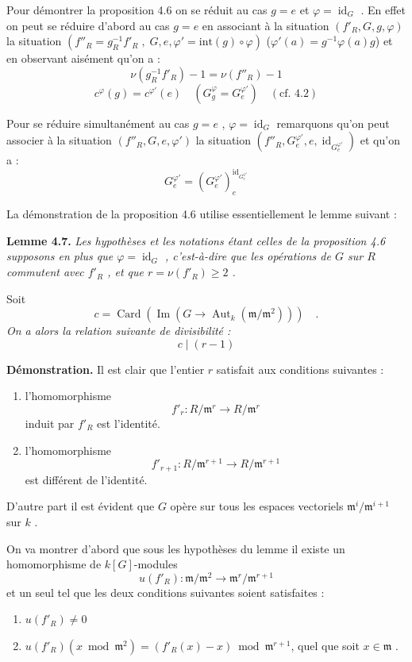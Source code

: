 \documentclass[11pt]{article}
\providecommand{\fm}{\mathfrak{m}}
\providecommand{\id}{\operatorname{id}}
\providecommand{\id}{\operatorname{id}}
\providecommand{\id}{\operatorname{id}}
\providecommand{\Aut}{\operatorname{Aut}}
\providecommand{\id}{\operatorname{id}}
\providecommand{\id}{\operatorname{id}}
\providecommand{\im}{\operatorname{Im}}
\providecommand{\fm}{\mathfrak m}
\providecommand{\im}{\operatorname{im}}
\providecommand{\Aut}{\operatorname{Aut}}
\providecommand{\id}{\operatorname{id}}
\begin{document}
\medskip

Pour démontrer la proposition 4.6 on se réduit au cas $g = e$ et $\varphi = \id_G$ . En effet on peut se réduire d'abord au cas $g = e$ en associant à la situation $(f'_R, G, g, \varphi)$ la situation $(f''_R = g_R^{-1}f'_R \; , \; G, e, \varphi' = \mathrm{int}(g) \circ \varphi)$ ($\varphi'(a) = g^{-1}\varphi(a)g$) et en observant aisément qu'on a :
\[
\nu(g_R^{-1}f'_R) - 1 = \nu(f''_R) - 1
\]
\[
c^\varphi(g) = c^{\varphi'}(e) \quad (G_g^\varphi = G_e^{\varphi'}) \quad (\text{cf. 4.2})
\]

Pour se réduire simultanément au cas $g = e$ , $\varphi = \id_G$ remarquons qu'on peut associer à la situation $(f''_R, G, e, \varphi')$ la situation $(f''_R, G_e^{\varphi'}, e, \id_{G_e^{\varphi'}})$ et qu'on a :
\[
G_e^{\varphi'} = (G_e^{\varphi'})_e^{\id_{G_e^{\varphi'}}}
\]

La démonstration de la proposition 4.6 utilise essentiellement le lemme suivant :

\medskip
\noindent
\textbf{Lemme 4.7.} \emph{Les hypothèses et les notations étant celles de la proposition 4.6 supposons en plus que $\varphi = \id_G$ , c'est-à-dire que les opérations de $G$ sur $R$ commutent avec $f'_R$ , et que $r = \nu(f'_R) \geq 2$ .}

Soit
\emph{\[
c = \operatorname{Card}(\im(G \longrightarrow \Aut_k(\fm/\fm^2))) \quad .
\]
On a alors la relation suivante de divisibilité :
\[
c \mid (r - 1)
\]}

\medskip

\noindent
\textbf{Démonstration.} Il est clair que l'entier $r$ satisfait aux conditions suivantes :
\begin{enumerate}
\item[a)] l'homomorphisme
\[
f'_r : R/\fm^r \longrightarrow R/\fm^r
\]
induit par $f'_R$ est l'identité.
\item[b)] l'homomorphisme
\[
f'_{r+1} : R/\fm^{r+1} \longrightarrow R/\fm^{r+1}
\]
est différent de l'identité.
\end{enumerate}

D'autre part il est évident que $G$ opère sur tous les espaces vectoriels $\fm^i/\fm^{i+1}$ sur $k$ .

On va montrer d'abord que sous les hypothèses du lemme il existe un homomorphisme de $k[G]$-modules
\[
u(f'_R) : \fm/\fm^2 \longrightarrow \fm^r/\fm^{r+1}
\]
et un seul tel que les deux conditions suivantes soient satisfaites :
\begin{enumerate}
\item[1)] $u(f'_R) \neq 0$
\item[2)] $u(f'_R)(x \bmod \fm^2) = (f'_R(x) - x) \bmod \fm^{r+1}$, quel que soit $x \in \fm$ .
\end{enumerate}
\end{document}
